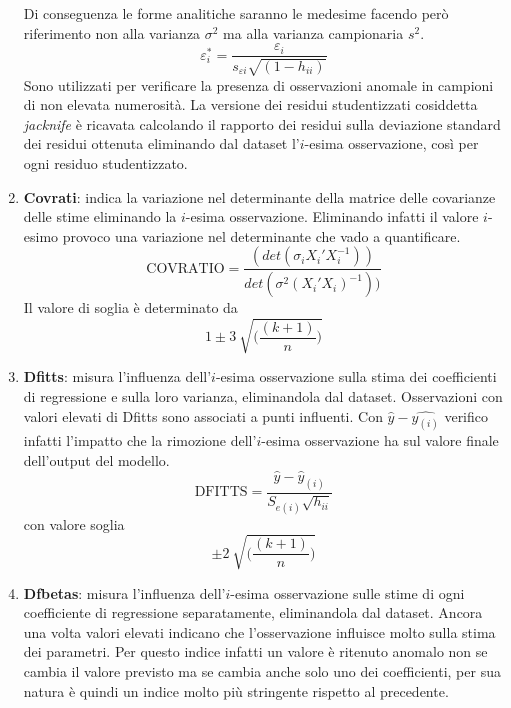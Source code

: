 \documentclass[a4page, 11pt]{article} %
\begin{document}
\begin{enumerate}
Di conseguenza le forme analitiche saranno le medesime facendo però riferimento non alla varianza $\sigma^2$ ma alla varianza campionaria $s^2$.
\begin{equation*}
\varepsilon_i^* = \frac{\varepsilon_i}{s_{\varepsilon i} \sqrt{(1-h_{ii})}}
\end{equation*}
Sono utilizzati per verificare la presenza di osservazioni anomale in campioni di non elevata numerosità. La versione dei residui studentizzati cosiddetta \textit{jacknife} è ricavata calcolando il rapporto dei residui sulla deviazione standard dei residui ottenuta eliminando dal dataset l'$i$-esima osservazione, così per ogni residuo studentizzato.
\item \textbf{Covrati}: indica la variazione nel determinante della matrice delle covarianze delle stime eliminando la $i$-esima osservazione. Eliminando infatti il valore $i$-esimo provoco una variazione nel determinante che vado a quantificare.
\begin{equation*}
\mathrm{COVRATIO} = \frac{(det(\sigma_i X_i'X_i^{-1}))}{det(\sigma^2(X_i'X_i)^{-1}))}
\end{equation*}
Il valore di soglia è determinato da
\begin{equation*}
1\pm 3 \  \sqrt{\biggl(\frac{(k+1)}{n}\biggr)}
\end{equation*}
\item \textbf{Dfitts}: misura l’influenza dell'$i$-esima osservazione sulla stima dei coefficienti di regressione e sulla loro varianza, eliminandola dal dataset. Osservazioni con valori elevati di Dfitts sono associati a punti influenti. Con $\hat{y} - \hat{y_{(i)}}$ verifico infatti l'impatto che la rimozione dell'$i$-esima osservazione ha sul valore finale dell'output del modello.
\begin{equation*}
\mathrm{DFITTS} = \frac{\hat{y} - \hat{y}_{(i)}}{S_{e(i)}\sqrt{h_{ii}}}
\end{equation*}
con valore soglia
\begin{equation*}
\pm 2 \ \sqrt{\biggl(\frac{(k+1)}{n}\biggr)}
\end{equation*}
\item \textbf{Dfbetas}: misura l’influenza dell'$i$-esima osservazione sulle stime di ogni coefficiente di regressione separatamente, eliminandola dal dataset. Ancora una volta valori elevati indicano che l'osservazione influisce molto sulla stima dei parametri. Per questo indice infatti un valore è ritenuto anomalo non se cambia il valore previsto ma se cambia anche solo uno dei coefficienti, per sua natura è quindi un indice molto più stringente rispetto al precedente.

\end{enumerate}
\end{document}

